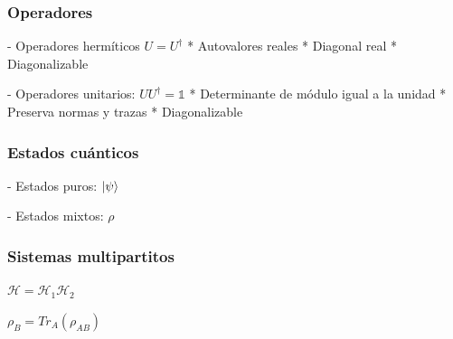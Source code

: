 \documentclass[xetex,mathserif,serif]{beamer}
\begin{document}
\begin{frame}
    \frametitle{Operadores}

- Operadores hermíticos $U = U^\dagger$
    * Autovalores reales
    * Diagonal real
    * Diagonalizable

- Operadores unitarios: $U U^\dagger = \mathds{1}$
    * Determinante de módulo igual a la unidad
    * Preserva normas y trazas
    * Diagonalizable

\end{frame}

\begin{frame}
    \frametitle{Estados cuánticos}

- Estados puros: $\ket{\psi}$

- Estados mixtos: $\rho$

\end{frame}

\begin{frame}
    \frametitle{Sistemas multipartitos}

$\mathcal{H} = \mathcal{H}_1 \mathcal{H}_2$

$\rho_B = Tr_A(\rho_{AB})$

\end{frame}
\end{document}
